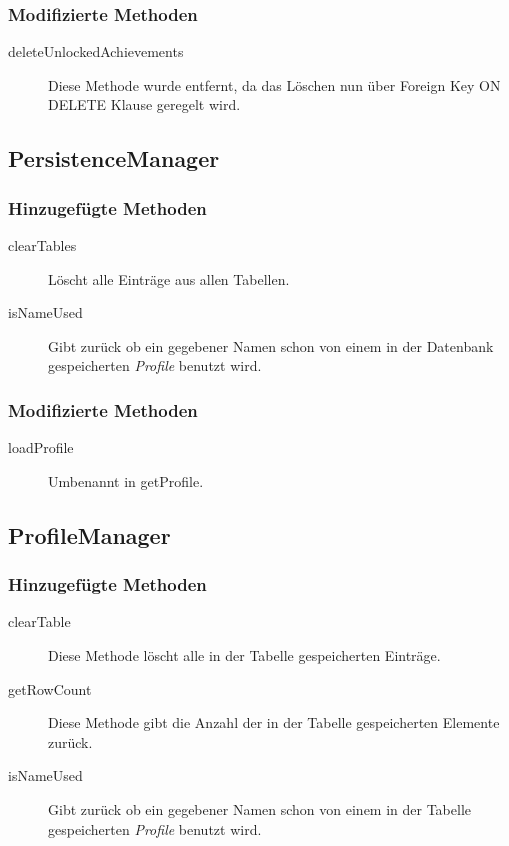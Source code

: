\subsubsection{Modifizierte Methoden}
\begin{description}
\item[deleteUnlockedAchievements]
Diese Methode wurde entfernt, da das Löschen nun über Foreign Key ON DELETE Klause geregelt wird.
\end{description}


\subsection{PersistenceManager}

\subsubsection{Hinzugefügte Methoden}
\begin{description}
\item[clearTables]
Löscht alle Einträge aus allen Tabellen.
\item[isNameUsed]
Gibt zurück ob ein gegebener Namen schon von einem in der Datenbank gespeicherten \emph{Profile} benutzt wird.
\end{description}

\subsubsection{Modifizierte Methoden}
\begin{description}
\item[loadProfile]
Umbenannt in getProfile.
\end{description}


\subsection{ProfileManager}

\subsubsection{Hinzugefügte Methoden}
\begin{description}
\item[clearTable]
Diese Methode löscht alle in der Tabelle gespeicherten Einträge.
\item[getRowCount]
Diese Methode gibt die Anzahl der in der Tabelle gespeicherten Elemente zurück.
\item[isNameUsed]
Gibt zurück ob ein gegebener Namen schon von einem in der Tabelle gespeicherten \emph{Profile} benutzt wird.
\end{description}


